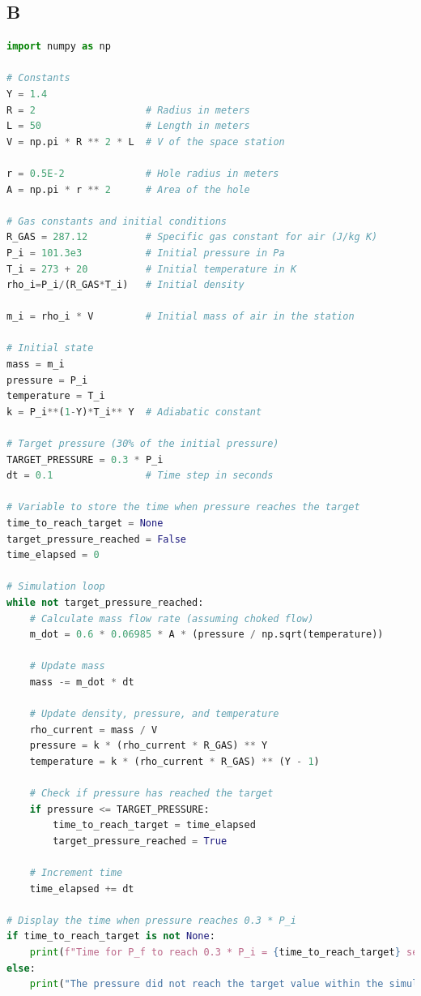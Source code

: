 \documentclass[a4paper, 14pt]{extarticle}
\begin{document}
\subsection*{B}
\begin{lstlisting}[language=Python]
import numpy as np

# Constants
Y = 1.4
R = 2                   # Radius in meters
L = 50                  # Length in meters
V = np.pi * R ** 2 * L  # V of the space station

r = 0.5E-2              # Hole radius in meters
A = np.pi * r ** 2      # Area of the hole

# Gas constants and initial conditions
R_GAS = 287.12          # Specific gas constant for air (J/kg K)
P_i = 101.3e3           # Initial pressure in Pa
T_i = 273 + 20          # Initial temperature in K
rho_i=P_i/(R_GAS*T_i)   # Initial density

m_i = rho_i * V         # Initial mass of air in the station

# Initial state
mass = m_i
pressure = P_i
temperature = T_i
k = P_i**(1-Y)*T_i** Y  # Adiabatic constant

# Target pressure (30% of the initial pressure)
TARGET_PRESSURE = 0.3 * P_i
dt = 0.1                # Time step in seconds

# Variable to store the time when pressure reaches the target
time_to_reach_target = None
target_pressure_reached = False
time_elapsed = 0

# Simulation loop
while not target_pressure_reached:
    # Calculate mass flow rate (assuming choked flow)
    m_dot = 0.6 * 0.06985 * A * (pressure / np.sqrt(temperature))

    # Update mass
    mass -= m_dot * dt

    # Update density, pressure, and temperature
    rho_current = mass / V
    pressure = k * (rho_current * R_GAS) ** Y
    temperature = k * (rho_current * R_GAS) ** (Y - 1)

    # Check if pressure has reached the target
    if pressure <= TARGET_PRESSURE:
        time_to_reach_target = time_elapsed
        target_pressure_reached = True

    # Increment time
    time_elapsed += dt

# Display the time when pressure reaches 0.3 * P_i
if time_to_reach_target is not None:
    print(f"Time for P_f to reach 0.3 * P_i = {time_to_reach_target} seconds")
else:
    print("The pressure did not reach the target value within the simulation time.")
\end{lstlisting}
\newpage
\end{document}
